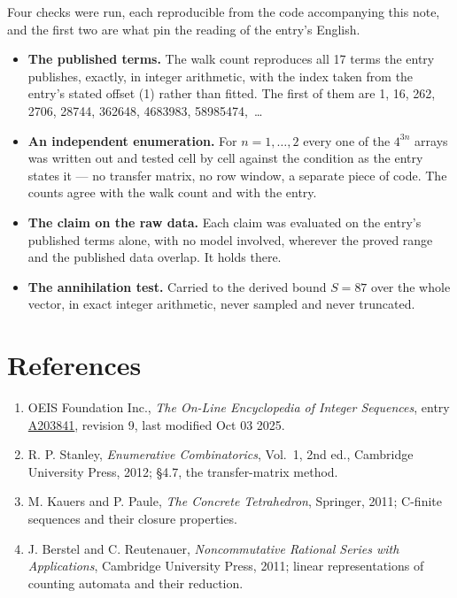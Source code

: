 \documentclass[11pt]{article}
\theoremstyle{definition}
\begin{document}
Four checks were run, each reproducible from the code accompanying this note, and the first two are what pin the reading of the entry's English.

\begin{itemize}

\item {\bfseries The published terms.} The walk count reproduces all 17 terms the entry publishes, exactly, in integer arithmetic, with the index taken from the entry's stated offset (1) rather than fitted. The first of them are 1, 16, 262, 2706, 28744, 362648, 4683983, 58985474,~\dots

\item {\bfseries An independent enumeration.} For $n = 1,\dots,2$ every one of the $4^{3n}$ arrays was written out and tested cell by cell against the condition as the entry states it --- no transfer matrix, no row window, a separate piece of code. The counts agree with the walk count and with the entry.

\item {\bfseries The claim on the raw data.} Each claim was evaluated on the entry's published terms alone, with no model involved, wherever the proved range and the published data overlap. It holds there.

\item {\bfseries The annihilation test.} Carried to the derived bound $S = 87$ over the whole vector, in exact integer arithmetic, never sampled and never truncated.

\end{itemize}

\section{References}

\begin{enumerate}

\item OEIS Foundation Inc., \emph{The On-Line Encyclopedia of Integer Sequences}, entry \href{https://oeis.org/A203841}{A203841}, revision 9, last modified Oct 03 2025.

\item R. P. Stanley, \emph{Enumerative Combinatorics}, Vol.~1, 2nd ed., Cambridge University Press, 2012; \S4.7, the transfer-matrix method.

\item M. Kauers and P. Paule, \emph{The Concrete Tetrahedron}, Springer, 2011; C-finite sequences and their closure properties.

\item J. Berstel and C. Reutenauer, \emph{Noncommutative Rational Series with Applications}, Cambridge University Press, 2011; linear representations of counting automata and their reduction.

\end{enumerate}
\end{document}
